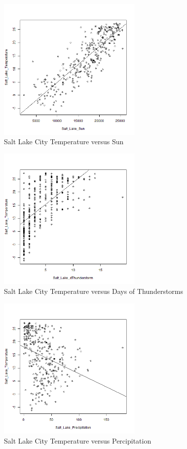 \begin{figure}
  \centering
  \includegraphics[width=7cm]{../data/img/Temp_vs_sun.PNG}
  \caption{Salt Lake City Temperature versus Sun}
  \label{fig:temp_vs_sun}
\end{figure}

\begin{figure}
  \centering
  \includegraphics[width=7cm]{../data/img/Temp_vs_dThunderstorm.PNG}
  \caption{Salt Lake City Temperature versus Days of Thunderstorms}
  \label{fig:temp_vs_dthunderstorms}
\end{figure}

\begin{figure}
  \centering
  \includegraphics[width=7cm]{../data/img/Temp_vs_Precipitation.PNG}
  \caption{Salt Lake City Temperature versus Percipitation}
  \label{fig:temp_vs_percipitation}
\end{figure}

